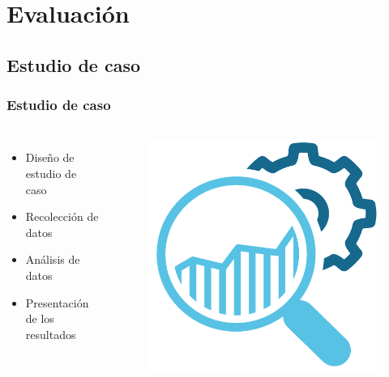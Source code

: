 \documentclass[9pt]{beamer}
\begin{document}
        

    \section{Evaluación}
    \subsection{Estudio de caso}

    \begin{frame}
        \frametitle{Estudio de caso}                       
       
       \begin{columns}
            \begin{itemize}
                \item Diseño de estudio de caso
                \item Recolección de datos
                \item Análisis de datos
                \item Presentación de los resultados
            \end{itemize}

            \begin{figure}
                \includegraphics[width=\textwidth]{assets/Relleno/Investigacion.png}
            \end{figure}
       \end{columns}
    \end{frame}
\end{document}

